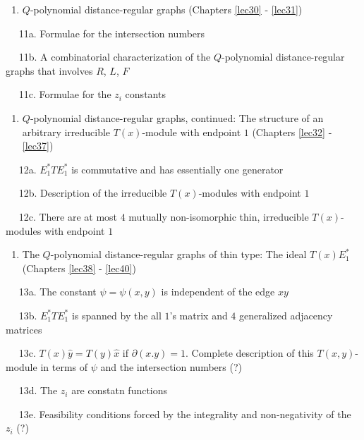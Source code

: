 \documentclass[
]{book}
\providecommand{\tightlist}{%
  \setlength{\itemsep}{0pt}\setlength{\parskip}{0pt}}
\theoremstyle{definition}
\theoremstyle{definition}
\theoremstyle{definition}
\theoremstyle{definition}
\theoremstyle{remark}
\begin{document}
\begin{enumerate}
\def\labelenumi{\arabic{enumi}.}
\setcounter{enumi}{10}
\tightlist
\item
  \(Q\)-polynomial distance-regular graphs (Chapters \ref{lec30} - \ref{lec31})
\end{enumerate}

\(\quad\) 11a. Formulae for the intersection numbers

\(\quad\) 11b. A combinatorial characterization of the \(Q\)-polynomial distance-regular graphs that involves \(R\), \(L\), \(F\)

\(\quad\) 11c. Formulae for the \(z_i\) constants

\begin{enumerate}
\def\labelenumi{\arabic{enumi}.}
\setcounter{enumi}{11}
\tightlist
\item
  \(Q\)-polynomial distance-regular graphs, continued: The structure of an arbitrary irreducible \(T(x)\)-module with endpoint \(1\) (Chapters \ref{lec32} - \ref{lec37})
\end{enumerate}

\(\quad\) 12a. \(E^*_1TE^*_1\) is commutative and has essentially one generator

\(\quad\) 12b. Description of the irreducible \(T(x)\)-modules with endpoint \(1\)

\(\quad\) 12c. There are at most \(4\) mutually non-isomorphic thin, irreducible \(T(x)\)-modules with endpoint \(1\)

\begin{enumerate}
\def\labelenumi{\arabic{enumi}.}
\setcounter{enumi}{12}
\tightlist
\item
  The \(Q\)-polynomial distance-regular graphs of thin type: The ideal \(T(x)E^*_1\) (Chapters \ref{lec38} - \ref{lec40})
\end{enumerate}

\(\quad\) 13a. The constant \(\psi = \psi(x,y)\) is independent of the edge \(xy\)

\(\quad\) 13b. \(E^*_1TE^*_1\) is spanned by the all \(1\)'s matrix and \(4\) generalized adjacency matrices

\(\quad\) 13c. \(T(x)\hat{y} = T(y)\hat{x}\) if \(\partial(x.y)=1\). Complete description of this \(T(x,y)\)-module in terms of \(\psi\) and the intersection numbers (?)

\(\quad\) 13d. The \(z_i\) are constatn functions

\(\quad\) 13e. Feasibility conditions forced by the integrality and non-negativity of the \(z_i\) (?)
\end{document}
